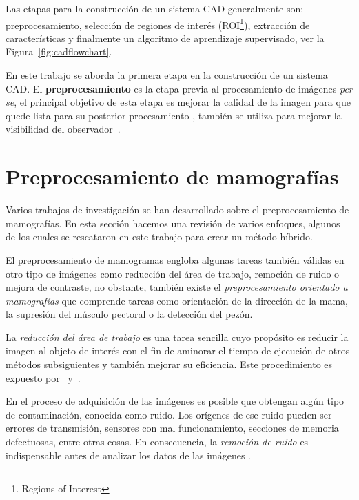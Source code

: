 Las etapas para la construcción de un sistema CAD generalmente son:
preprocesamiento, selección de regiones de interés (ROI\footnote{Regions of
Interest}), extracción de características y finalmente un algoritmo de
aprendizaje supervisado, ver la Figura~\ref{fig:cadflowchart}.

\shorthandoff{>} %
    
\shorthandon{>} 

En este trabajo se aborda la primera etapa en la construcción de un sistema
CAD. El \textbf{preprocesamiento} es la etapa previa al procesamiento de
imágenes \textit{per se}, el principal objetivo de esta etapa es mejorar la
calidad de la imagen para que quede lista para su posterior procesamiento
\cite{ponraj2011survey}, también se utiliza para mejorar la visibilidad del
observador~\cite{rahmati2010new}. 

\section{Preprocesamiento de mamografías}

Varios trabajos de investigación se han desarrollado sobre el preprocesamiento
de mamografías. En esta sección hacemos una revisión de varios enfoques,
algunos de los cuales se rescataron en este trabajo para crear un método híbrido.

El preprocesamiento de mamogramas engloba algunas tareas también válidas en
otro tipo de imágenes como reducción del área de trabajo, remoción de ruido o
mejora de contraste, no obstante, también existe el \textit{preprocesamiento
orientado a mamografías} que comprende tareas como orientación de la dirección
de la mama, la supresión del músculo pectoral o la detección del pezón.

La \textit{reducción del área de trabajo} es una tarea sencilla cuyo propósito
es reducir la imagen al objeto de interés con el fin de aminorar el tiempo de
ejecución de otros métodos subsiguientes y también mejorar su eficiencia. Este
procedimiento es expuesto por~\cite{holguinpre} y~\cite{dehghani2011method}.

En el proceso de adquisición de las imágenes es posible que obtengan algún tipo
de contaminación, conocida como ruido. Los orígenes de ese ruido pueden ser
errores de transmisión, sensores con mal funcionamiento, secciones de memoria
defectuosas, entre otras cosas. En consecuencia, la \textit{remoción de ruido}
es indispensable antes de analizar los datos de las imágenes
\cite{motwani2004survey}.

